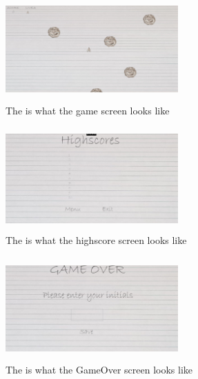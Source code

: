 \documentclass[10pt,conference,onecolumn,compsoc]{IEEEtran}
\begin{document}
\begin{figure}[ht!]
\centering
\includegraphics[height=150px, width=250px]{Game.png}
\caption{The is what the game screen looks like}
\label{Game screen}
\end{figure}

\begin{figure}[ht!]
\centering
\includegraphics[height=150px, width=250px]{Highscore.png}
\caption{The is what the highscore screen looks like}
\label{High Score screen}
\end{figure}

\begin{figure}[ht!]
\centering
\includegraphics[height=150px, width=250px]{GameOver.png}
\caption{The is what the GameOver screen looks like}
\label{Game Over screen}
\end{figure}
\end{document}
